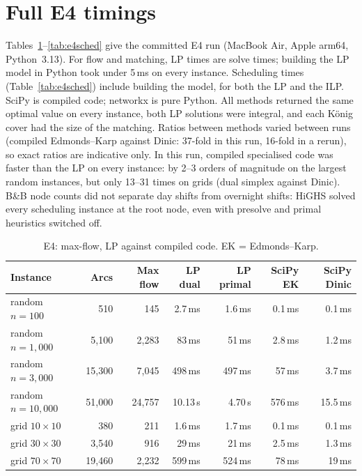 \section{Full E4 timings}\label{app:e4}

Tables~\ref{tab:e4flow}--\ref{tab:e4sched} give the committed E4 run (MacBook Air, Apple arm64, Python~3.13). For flow and matching, LP times are solve times; building the LP model in Python took under 5\,ms on every instance. Scheduling times (Table~\ref{tab:e4sched}) include building the model, for both the LP and the ILP. SciPy is compiled code; networkx is pure Python. All methods returned the same optimal value on every instance, both LP solutions were integral, and each König cover had the size of the matching. Ratios between methods varied between runs (compiled Edmonds--Karp against Dinic: 37-fold in this run, 16-fold in a rerun), so exact ratios are indicative only. In this run, compiled specialised code was faster than the LP on every instance: by 2--3 orders of magnitude on the largest random instances, but only 13--31 times on grids (dual simplex against Dinic). B\&B node counts did not separate day shifts from overnight shifts: HiGHS solved every scheduling instance at the root node, even with presolve and primal heuristics switched off.

\begin{table}[H]
  \centering\small
  \caption{E4: max-flow, LP against compiled code. EK = Edmonds--Karp.}
  \label{tab:e4flow}
  \begin{tabular}{@{}lrrrrrr@{}}
    \toprule
    Instance & Arcs & Max flow & LP dual & LP primal & SciPy EK & SciPy Dinic \\
    \midrule
    random $n=100$ & 510 & 145 & 2.7\,ms & 1.6\,ms & 0.1\,ms & 0.1\,ms \\
    random $n=1{,}000$ & 5,100 & 2,283 & 83\,ms & 51\,ms & 2.8\,ms & 1.2\,ms \\
    random $n=3{,}000$ & 15,300 & 7,045 & 498\,ms & 497\,ms & 57\,ms & 3.7\,ms \\
    random $n=10{,}000$ & 51,000 & 24,757 & 10.13\,s & 4.70\,s & 576\,ms & 15.5\,ms \\
    grid $10\times10$ & 380 & 211 & 1.6\,ms & 1.7\,ms & 0.1\,ms & 0.1\,ms \\
    grid $30\times30$ & 3,540 & 916 & 29\,ms & 21\,ms & 2.5\,ms & 1.3\,ms \\
    grid $70\times70$ & 19,460 & 2,232 & 599\,ms & 524\,ms & 78\,ms & 19\,ms \\
    \bottomrule
  \end{tabular}
\end{table}

